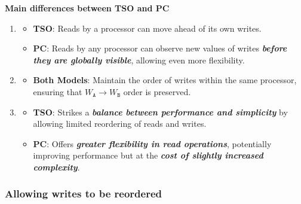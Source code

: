 \highspace
\begin{flushleft}
    \textcolor{Green3}{ \textbf{Main differences between TSO and PC}}
\end{flushleft}
\begin{enumerate}
    \item {}
    \begin{itemize}
        \item \textbf{TSO}: Reads by a processor can move ahead of its own writes.
        \item \textbf{PC}: Reads by any processor can observe new values of writes \textbf{\emph{before they are globally visible}}, allowing even more flexibility.
    \end{itemize}

    \item {}
    \begin{itemize}
        \item \textbf{Both Models}: Maintain the order of writes within the same processor, ensuring that $W_{\texttt{A}} \rightarrow W_{\texttt{B}}$ order is preserved.
    \end{itemize}

    \item {}
    \begin{itemize}
        \item \textbf{TSO}: Strikes a \textbf{\emph{balance between performance and simplicity}} by allowing limited reordering of reads and writes.
        \item \textbf{PC}: Offers \emph{\textbf{greater flexibility in read operations}}, potentially improving performance but at the \textbf{\emph{cost of slightly increased complexity}}.
    \end{itemize}
\end{enumerate}

\newpage

\subsubsection{Allowing writes to be reordered}

